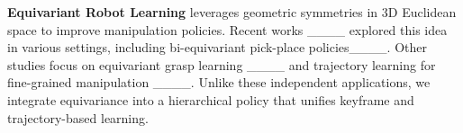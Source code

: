 


\textbf{Equivariant Robot Learning} 
leverages geometric symmetries in 3D Euclidean space to improve manipulation policies. 
Recent works ____ explored this idea in various settings, including bi-equivariant pick-place policies____. Other studies focus on equivariant grasp learning ____ and trajectory learning for fine-grained manipulation ____. Unlike these independent applications, we integrate equivariance into a hierarchical policy that unifies keyframe and trajectory-based learning.

